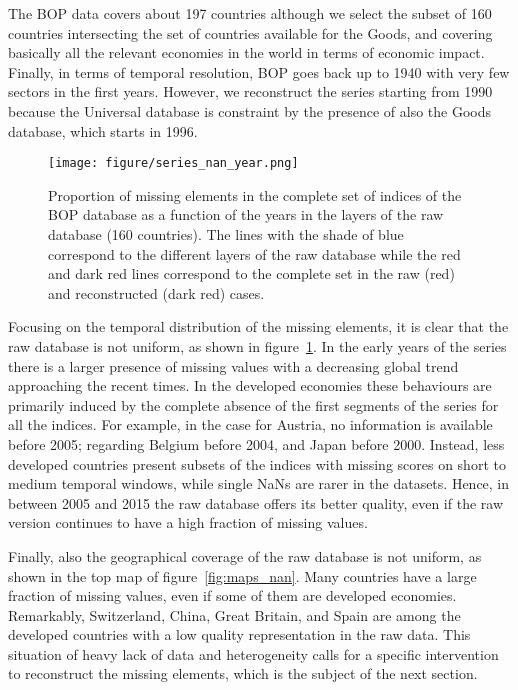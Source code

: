 \documentclass[fleqn,10pt]{article}
\begin{document}
The BOP data covers about 197 countries although we select the subset of 160 countries intersecting the set of countries available for the Goods, and covering basically all the relevant economies in the world in terms of economic impact.
Finally, in terms of temporal resolution, BOP goes back up to 1940 with very few sectors in the first years.
However, we reconstruct the series starting from 1990 because the Universal database is constraint by the presence of also the Goods database, which starts in 1996.

\begin{figure}
	\centering
	\texttt{[image: figure/series\_nan\_year.png]}	
	\caption{Proportion of missing elements in the complete set of indices of the BOP database as a function of the years in the layers of the raw database (160 countries).
		The lines with the shade of blue correspond to the different layers of the raw database while the red and dark red lines correspond to the complete set in the raw (red) and reconstructed (dark red) cases.}
	\label{fig:freq_nan}
\end{figure}
Focusing on the temporal distribution of the missing elements, it is clear that the raw database is not uniform, as shown in figure~\ref{fig:freq_nan}.
In the early years of the series there is a larger presence of missing values with a decreasing global trend approaching the recent times.
In the developed economies these behaviours are primarily induced by the complete absence of the first segments of the series for all the indices.
For example, in the case for Austria, no information is available before 2005; regarding Belgium before 2004, and Japan before 2000.
Instead, less developed countries present subsets of the indices with missing scores on short to medium temporal windows, while single NaNs are rarer in the datasets.
Hence, in between 2005 and 2015 the raw database offers its better quality, even if the raw version continues to have a high fraction of missing values.

Finally, also the geographical coverage of the raw database is not uniform, as shown in the top map of figure~\ref{fig:maps_nan}.
Many countries have a large fraction of missing values, even if some of them are developed economies.
Remarkably, Switzerland, China, Great Britain, and Spain are among the developed countries with a low quality representation in the raw data.
This situation of heavy lack of data and heterogeneity calls for a specific intervention to reconstruct the missing elements, which is the subject of the next section.
\end{document}
